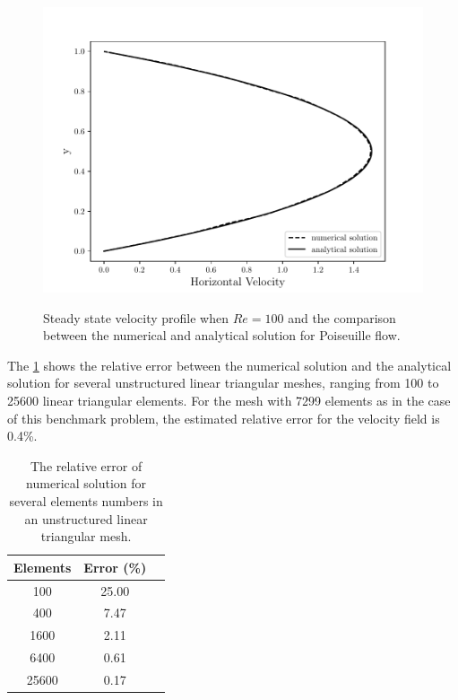 \vspace{1cm}
\begin{figure}[H]
     \caption{
Steady state velocity profile when $Re=100$ and the comparison between
the numerical and analytical solution for Poiseuille flow.} 
     \centering
     \includegraphics[scale=1]{./02_chaps/cap_validation/figure/poiseuille_velocity.pdf}\\
     \medskip
     \label{velocidade poiseuille}
\end{figure}

\newpage
The \ref{erro relativo poiseuille tabela} shows the relative error 
between the numerical solution and the analytical solution 
for several unstructured linear triangular meshes, ranging 
from 100 to 25600 linear triangular elements. For the mesh 
with 7299 elements as in the case of this benchmark problem, 
the estimated relative error for the velocity field is 0.4\%.

\vspace{0.5cm}
\begin{table}[H]
\centering
\begin{tabular}{ccc}
\toprule
\textbf{Elements} & \textbf{Error} (\%) \\
\midrule
100 & 25.00 \\
400 & 7.47 \\
1600 & 2.11 \\
6400 & 0.61 \\
25600 & 0.17 \\
\bottomrule
\end{tabular}
\caption{The relative error of numerical solution for several elements numbers in an unstructured linear triangular mesh.}
\label{erro relativo poiseuille tabela}
\end{table}

